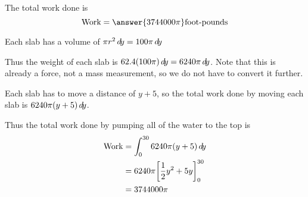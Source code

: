 \documentclass{ximera}
\begin{document}
\begin{example}
\begin{explanation}
\begin{image}
    \end{image}
    The total work done is
    \[
    \textrm{Work} = \answer{3744000 \pi} \text{foot-pounds}
    \]
    \begin{hint}
      Each slab has a volume of $\pi r^2 \mathop{}\!d\! y = 100\pi \mathop{}\!d\! y$
    \end{hint}
    \begin{hint}
      Thus the weight of each slab is $62.4(100\pi)\mathop{}\!d\! y = 6240\pi \mathop{}\!d\!
      y$.  Note that this is already a force, not a mass measurement,
      so we do not have to convert it further.
    \end{hint}
    \begin{hint}
      Each slab has to move a distance of $y+5$, so the total work
      done by moving each slab is $6240 \pi (y+5) \mathop{}\!d\! y$.
    \end{hint}
    \begin{hint}
      Thus the total work done by pumping all of the water to the top is
      \begin{align*}
	\text{Work} &= \int_0^{30} 6240 \pi (y+5) \mathop{}\!d\! y\\
	&= 6240 \pi \bigg[ \frac{1}{2}y^2+5y \bigg]_0^{30}\\
	&=  3744000 \pi
      \end{align*}
    \end{hint}
  \end{explanation}
\end{example}
\end{document}
